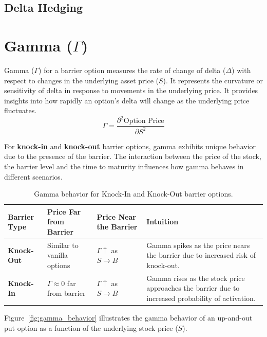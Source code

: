 \subsection{Delta Hedging}

\section{Gamma (\(\Gamma\))}

Gamma (\(\Gamma\)) for a barrier option measures the rate of change of delta (\(\Delta\)) with respect to changes in the underlying asset price (\(S\)). It represents the curvature or sensitivity of delta in response to movements in the underlying price. It provides insights into how rapidly an option's delta will change as the underlying price fluctuates.
\[
\Gamma = \frac{\partial^2 \text{Option Price}}{\partial S^2}
\]

For \textbf{knock-in} and \textbf{knock-out} barrier options, gamma exhibits unique behavior due to the presence of the barrier. The interaction between the price of the stock, the barrier level and the time to maturity influences how gamma behaves in different scenarios.

\begin{center}
	\begin{table}[H]
		\begin{tabular}{ | m{3cm} | m{5cm}| m{4cm} | m{4cm}|} 
			\hline
			\textbf{Barrier Type} & \textbf{Price Far from Barrier} & \textbf{Price Near the Barrier} & \textbf{Intuition}  \\ 
			\hline
			\textbf{Knock-Out} & Similar to vanilla options     & $\Gamma \uparrow$ as $S \to B$  & Gamma spikes as the price nears the barrier due to increased risk of knock-out. \\ 
			\hline
			\textbf{Knock-In}    & $\Gamma \approx 0$ far from barrier   & $\Gamma \uparrow$ as $S \to B$  & Gamma rises as the stock price approaches the barrier due to increased probability of activation. \\ 
			\hline
		\end{tabular}
\caption{Gamma behavior for Knock-In and Knock-Out barrier options.}
\label{tab:gamma_barrier_options}
	\end{table}
\end{center}

Figure~\ref{fig:gamma_behavior} illustrates the gamma behavior of an up-and-out put option as a function of the underlying stock price (\(S\)). 

